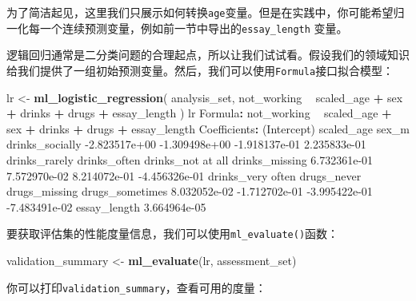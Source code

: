 \documentclass[
]{article}
\newenvironment{Shaded}{\begin{snugshade}}{\end{snugshade}}
\newcommand{\FloatTok}[1]{\textcolor[rgb]{0.00,0.00,0.81}{#1}}
\newcommand{\KeywordTok}[1]{\textcolor[rgb]{0.13,0.29,0.53}{\textbf{#1}}}
\newcommand{\NormalTok}[1]{#1}
\newcommand{\OperatorTok}[1]{\textcolor[rgb]{0.81,0.36,0.00}{\textbf{#1}}}
\newcommand{\StringTok}[1]{\textcolor[rgb]{0.31,0.60,0.02}{#1}}
\begin{document}
为了简洁起见，这里我们只展示如何转换\texttt{age}变量。但是在实践中，你可能希望归一化每一个连续预测变量，例如前一节中导出的\texttt{essay\_length}
变量。

逻辑回归通常是二分类问题的合理起点，所以让我们试试看。假设我们的领域知识给我们提供了一组初始预测变量。然后，我们可以使用\texttt{Formula}接口拟合模型：

\begin{Shaded}
\begin{Highlighting}[]
\NormalTok{lr <-}\StringTok{ }\KeywordTok{ml_logistic_regression}\NormalTok{(}
\NormalTok{analysis_set, not_working }\OperatorTok{~}\StringTok{ }\NormalTok{scaled_age }\OperatorTok{+}\StringTok{ }\NormalTok{sex }\OperatorTok{+}\StringTok{ }\NormalTok{drinks }\OperatorTok{+}\StringTok{ }\NormalTok{drugs }\OperatorTok{+}\StringTok{ }\NormalTok{essay_length}
\NormalTok{)}
\NormalTok{lr}
\NormalTok{Formula}\OperatorTok{:}\StringTok{ }\NormalTok{not_working }\OperatorTok{~}\StringTok{ }\NormalTok{scaled_age }\OperatorTok{+}\StringTok{ }\NormalTok{sex }\OperatorTok{+}\StringTok{ }\NormalTok{drinks }\OperatorTok{+}\StringTok{ }\NormalTok{drugs }\OperatorTok{+}\StringTok{ }\NormalTok{essay_length}
\NormalTok{Coefficients}\OperatorTok{:}
\StringTok{ }\NormalTok{(Intercept) scaled_age sex_m drinks_socially}
 \FloatTok{-2.823517e+00} \FloatTok{-1.309498e+00} \FloatTok{-1.918137e-01} \FloatTok{2.235833e-01}
\NormalTok{ drinks_rarely drinks_often drinks_not at all drinks_missing}
 \FloatTok{6.732361e-01} \FloatTok{7.572970e-02} \FloatTok{8.214072e-01} \FloatTok{-4.456326e-01}
\NormalTok{drinks_very often drugs_never drugs_missing drugs_sometimes}
 \FloatTok{8.032052e-02} \FloatTok{-1.712702e-01} \FloatTok{-3.995422e-01} \FloatTok{-7.483491e-02}
\NormalTok{ essay_length}
 \FloatTok{3.664964e-05}
\end{Highlighting}
\end{Shaded}

要获取评估集的性能度量信息，我们可以使用\texttt{ml\_evaluate()}函数：

\begin{Shaded}
\begin{Highlighting}[]
\NormalTok{validation_summary <-}\StringTok{ }\KeywordTok{ml_evaluate}\NormalTok{(lr, assessment_set)}
\end{Highlighting}
\end{Shaded}

你可以打印\texttt{validation\_summary}，查看可用的度量：
\end{document}
